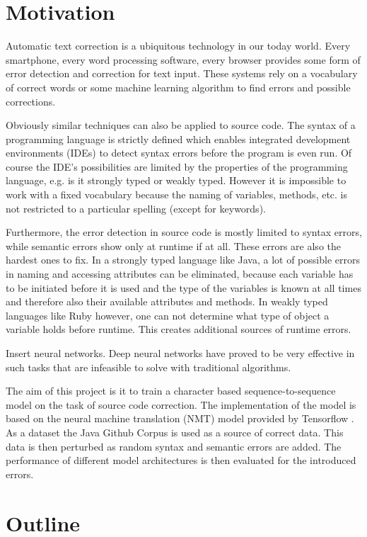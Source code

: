\section{Motivation}
Automatic text correction is a ubiquitous technology in our today world. Every smartphone, every word processing software, every browser provides some form of error detection and correction for text input. These systems rely on a vocabulary of correct words or some machine learning algorithm to find errors and possible corrections.

Obviously similar techniques can also be applied to source code. The syntax of a programming language is strictly defined which enables integrated development environments (IDEs) to detect syntax errors before the program is even run. Of course the IDE's possibilities are limited by the properties of the programming language, e.g. is it strongly typed or weakly typed. However it is impossible to work with a fixed vocabulary because the naming of variables, methods, etc. is not restricted to a particular spelling (except for keywords).

Furthermore, the error detection in source code is mostly limited to syntax errors, while semantic errors show only at runtime if at all. These errors are also the hardest ones to fix. In a strongly typed language like Java, a lot of possible errors in naming and accessing attributes can be eliminated, because each variable has to be initiated before it is used and the type of the variables is known at all times and therefore also their available attributes and methods. In weakly typed languages like Ruby however, one can not determine what type of object a variable holds before runtime. This creates additional sources of runtime errors.

Insert neural networks. Deep neural networks have proved to be very effective in such tasks that are infeasible to solve with traditional algorithms.

The aim of this project is it to train a character based sequence-to-sequence model on the task of source code correction. The implementation of the model is based on the neural machine translation (NMT) model provided by Tensorflow \cite{seq2seq_tutorial}. As a dataset the Java Github Corpus \cite{java_dataset} is used as a source of correct data. This data is then perturbed as random syntax and semantic errors are added. The performance of different model architectures is then evaluated for the introduced errors.

\section{Outline}
